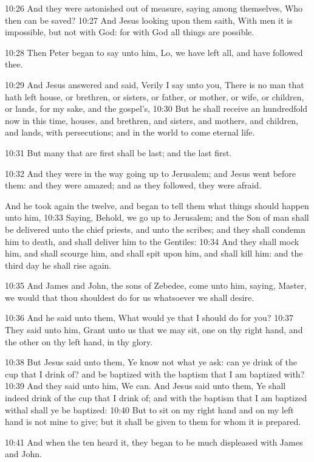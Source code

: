 10:26 And they were astonished out of measure, saying among themselves, Who then can be saved?  10:27 And Jesus looking upon them saith, With men it is impossible, but not with God: for with God all things are possible.

10:28 Then Peter began to say unto him, Lo, we have left all, and have followed thee.

10:29 And Jesus answered and said, Verily I say unto you, There is no man that hath left house, or brethren, or sisters, or father, or mother, or wife, or children, or lands, for my sake, and the gospel's, 10:30 But he shall receive an hundredfold now in this time, houses, and brethren, and sisters, and mothers, and children, and lands, with persecutions; and in the world to come eternal life.

10:31 But many that are first shall be last; and the last first.

10:32 And they were in the way going up to Jerusalem; and Jesus went before them: and they were amazed; and as they followed, they were afraid.

And he took again the twelve, and began to tell them what things should happen unto him, 10:33 Saying, Behold, we go up to Jerusalem; and the Son of man shall be delivered unto the chief priests, and unto the scribes; and they shall condemn him to death, and shall deliver him to the Gentiles: 10:34 And they shall mock him, and shall scourge him, and shall spit upon him, and shall kill him: and the third day he shall rise again.

10:35 And James and John, the sons of Zebedee, come unto him, saying, Master, we would that thou shouldest do for us whatsoever we shall desire.

10:36 And he said unto them, What would ye that I should do for you?  10:37 They said unto him, Grant unto us that we may sit, one on thy right hand, and the other on thy left hand, in thy glory.

10:38 But Jesus said unto them, Ye know not what ye ask: can ye drink of the cup that I drink of? and be baptized with the baptism that I am baptized with?  10:39 And they said unto him, We can. And Jesus said unto them, Ye shall indeed drink of the cup that I drink of; and with the baptism that I am baptized withal shall ye be baptized: 10:40 But to sit on my right hand and on my left hand is not mine to give; but it shall be given to them for whom it is prepared.

10:41 And when the ten heard it, they began to be much displeased with James and John.

